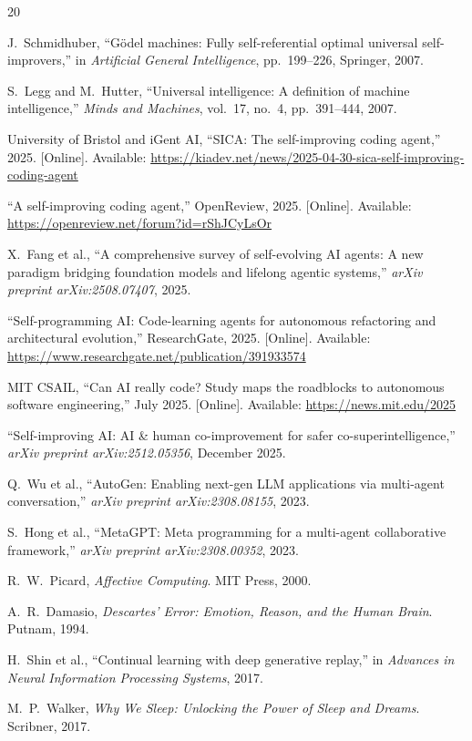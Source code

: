 \documentclass[11pt,a4paper]{article}
\begin{document}
\begin{thebibliography}{20}

J.~Schmidhuber, ``G\"{o}del machines: Fully self-referential optimal universal self-improvers,'' in \textit{Artificial General Intelligence}, pp.~199--226, Springer, 2007.

S.~Legg and M.~Hutter, ``Universal intelligence: A definition of machine intelligence,'' \textit{Minds and Machines}, vol.~17, no.~4, pp.~391--444, 2007.

University of Bristol and iGent AI, ``SICA: The self-improving coding agent,'' 2025. [Online]. Available: \url{https://kiadev.net/news/2025-04-30-sica-self-improving-coding-agent}

``A self-improving coding agent,'' OpenReview, 2025. [Online]. Available: \url{https://openreview.net/forum?id=rShJCyLsOr}

X.~Fang et al., ``A comprehensive survey of self-evolving AI agents: A new paradigm bridging foundation models and lifelong agentic systems,'' \textit{arXiv preprint arXiv:2508.07407}, 2025.

``Self-programming AI: Code-learning agents for autonomous refactoring and architectural evolution,'' ResearchGate, 2025. [Online]. Available: \url{https://www.researchgate.net/publication/391933574}

MIT CSAIL, ``Can AI really code? Study maps the roadblocks to autonomous software engineering,'' July 2025. [Online]. Available: \url{https://news.mit.edu/2025}

``Self-improving AI: AI \& human co-improvement for safer co-superintelligence,'' \textit{arXiv preprint arXiv:2512.05356}, December 2025.

Q.~Wu et al., ``AutoGen: Enabling next-gen LLM applications via multi-agent conversation,'' \textit{arXiv preprint arXiv:2308.08155}, 2023.

S.~Hong et al., ``MetaGPT: Meta programming for a multi-agent collaborative framework,'' \textit{arXiv preprint arXiv:2308.00352}, 2023.

R.~W.~Picard, \textit{Affective Computing}. MIT Press, 2000.

A.~R.~Damasio, \textit{Descartes' Error: Emotion, Reason, and the Human Brain}. Putnam, 1994.

H.~Shin et al., ``Continual learning with deep generative replay,'' in \textit{Advances in Neural Information Processing Systems}, 2017.

M.~P.~Walker, \textit{Why We Sleep: Unlocking the Power of Sleep and Dreams}. Scribner, 2017.

\end{thebibliography}
\end{document}
